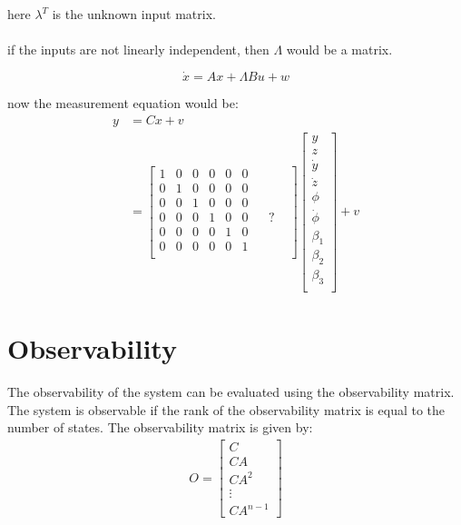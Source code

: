 \documentclass[12pt]{article}
\begin{document}
here $\lambda^T$ is the unknown input matrix. \\\\
if the inputs are not linearly independent, then $\Lambda$ would be a matrix.

$$\dot{x} = Ax + \Lambda B u + w$$

now the measurement equation would be:
\begin{align*}
    y &= Cx + v \\
    &= 
    \begin{bmatrix}
        1 & 0 & 0 & 0 & 0 & 0 &   &   &   \\
        0 & 1 & 0 & 0 & 0 & 0 &   &   &   \\
        0 & 0 & 1 & 0 & 0 & 0 &   &   &   \\
        0 & 0 & 0 & 1 & 0 & 0 &   & ? &   \\
        0 & 0 & 0 & 0 & 1 & 0 &   &   &   \\
        0 & 0 & 0 & 0 & 0 & 1 &   &   &   \\
    \end{bmatrix}
    \begin{bmatrix}
        y \\
        z \\
        \dot{y} \\
        \dot{z} \\
        \phi \\
        \dot{\phi} \\
        \beta_1 \\
        \beta_2 \\
        \beta_3 \\
    \end{bmatrix} + v
\end{align*}

\section*{Observability}
The observability of the system can be evaluated using the observability matrix. The system is observable if the rank of the observability matrix is equal to the number of states. The observability matrix is given by:
\begin{align*}
    O = \begin{bmatrix}
        C \\
        CA \\
        CA^2 \\
        \vdots \\
        CA^{n-1}
    \end{bmatrix}
\end{align*}
\end{document}
